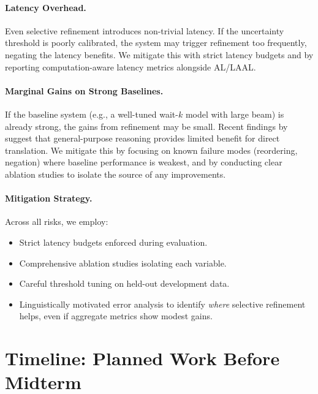 \paragraph{Latency Overhead.} Even selective refinement introduces non-trivial latency. If the uncertainty threshold is poorly calibrated, the system may trigger refinement too frequently, negating the latency benefits. We mitigate this with strict latency budgets and by reporting computation-aware latency metrics alongside AL/LAAL.

\paragraph{Marginal Gains on Strong Baselines.} If the baseline system (e.g., a well-tuned wait-$k$ model with large beam) is already strong, the gains from refinement may be small. Recent findings by \citet{li2025tts_mt} suggest that general-purpose reasoning provides limited benefit for direct translation. We mitigate this by focusing on known failure modes (reordering, negation) where baseline performance is weakest, and by conducting clear ablation studies to isolate the source of any improvements.

\paragraph{Mitigation Strategy.} Across all risks, we employ:
\begin{itemize}[leftmargin=*, itemsep=2pt]
    \item Strict latency budgets enforced during evaluation.
    \item Comprehensive ablation studies isolating each variable.
    \item Careful threshold tuning on held-out development data.
    \item Linguistically motivated error analysis to identify \emph{where} selective refinement helps, even if aggregate metrics show modest gains.
\end{itemize}


\section{Timeline: Planned Work Before Midterm}

